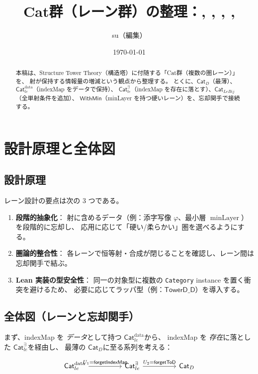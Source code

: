 \documentclass[a4paper,12pt]{ltjsarticle}
\title{Cat群（レーン群）の整理：\CatD, \Catledata, \Catleexists, \CatLeBij, \WithMin}
\author{su（編集）}
\date{\today}
\newcommand{\CatD}{\ensuremath{\mathsf{Cat}_D}}
\newcommand{\Catledata}{\ensuremath{\mathsf{Cat}_{le}^{\text{data}}}}
\newcommand{\Catleexists}{\ensuremath{\mathsf{Cat}_{le}^{\exists}}}
\newcommand{\CatLeBij}{\ensuremath{\mathsf{Cat}_{LeBij}}}
\newcommand{\WithMin}{\ensuremath{\mathsf{WithMin}}}
\newcommand{\minLayer}{\operatorname{minLayer}}
\begin{document}
\maketitle

\begin{abstract}
本稿は、Structure Tower Theory（構造塔）に付随する「Cat群（複数の圏レーン）」を、
射が保持する情報量の増減という観点から整理する。
とくに、\CatD（最薄）、\Catledata（indexMap をデータで保持）、
\Catleexists（indexMap を存在に落とす）、\CatLeBij（全単射条件を追加）、
\WithMin（minLayer を持つ硬いレーン）を、忘却関手で接続する。
\end{abstract}

\section{設計原理と全体図}

\subsection{設計原理}
レーン設計の要点は次の 3 つである。

\begin{enumerate}[label=(\roman*)]
  \item \textbf{段階的抽象化}：
  射に含めるデータ（例：添字写像 \(\varphi\)、最小層 \(\minLayer\)）を段階的に忘却し、
  応用に応じて「硬い/柔らかい」圏を選べるようにする。
  \item \textbf{圏論的整合性}：
  各レーンで恒等射・合成が閉じることを確認し、レーン間は忘却関手で結ぶ。
  \item \textbf{Lean 実装の型安全性}：
  同一の対象型に複数の \texttt{Category} instance を置く衝突を避けるため、
  必要に応じてラッパ型（例：\(\mathsf{TowerD\_D}\)）を導入する。
\end{enumerate}

\subsection{全体図（レーンと忘却関手）}

まず、indexMap を \emph{データ}として持つ \Catledata から、
indexMap を \emph{存在}に落とした \Catleexists を経由し、
最薄の \CatD に至る系列を考える：

\[
\begin{tikzcd}[column sep=huge]
  \Catledata \arrow[r, "U_1=\textsf{forgetIndexMap}"] &
  \Catleexists \arrow[r, "U_2=\textsf{forgetToD}"] &
  \CatD
\end{tikzcd}
\]
\end{document}
